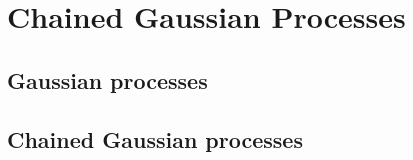 \chapter{Chained Gaussian Processes}\label{ch:chained_gps}

\section{Gaussian processes}

\section{Chained Gaussian processes}
